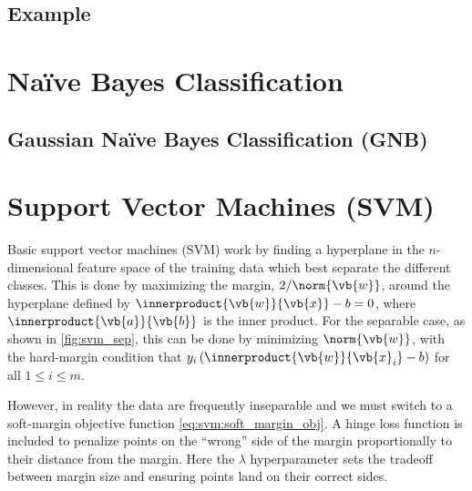 
\subsection{Example}
\label{class:logistic:example}

\section{N{a\"i}ve Bayes Classification}
\label{class:Bayes}

\subsection{Gaussian N{a\"i}ve Bayes Classification (GNB)}
\label{class:Bayes:GNB}

\section{Support Vector Machines (SVM)}
\label{class:SVM}

Basic support vector machines (SVM) work by finding a hyperplane in the $n$-dimensional
feature space of the training data which best separate the different classes.
This is done by maximizing the margin, $2/\norm{\vb{w}}$,
around the hyperplane defined by $\innerproduct{\vb{w}}{\vb{x}} - b = 0$,
where $\innerproduct{\vb{a}}{\vb{b}}$ is the inner product.
For the separable case, as shown in \cref{fig:svm_sep}, this
can be done by minimizing $\norm{\vb{w}}$, with the hard-margin condition that
$y_{i} \left(\innerproduct{\vb{w}}{\vb{x}_{i}} - b\right)$ for all $1 \leq i \leq m$.

However, in reality the data are frequently inseparable and we must switch
to a soft-margin objective function \cref{eq:svm:soft_margin_obj}.
A hinge loss function is included to penalize points on the ``wrong'' side of the margin
proportionally to their distance from the margin.
Here the $\lambda$ hyperparameter sets the tradeoff between
margin size and ensuring points land on their correct sides.

